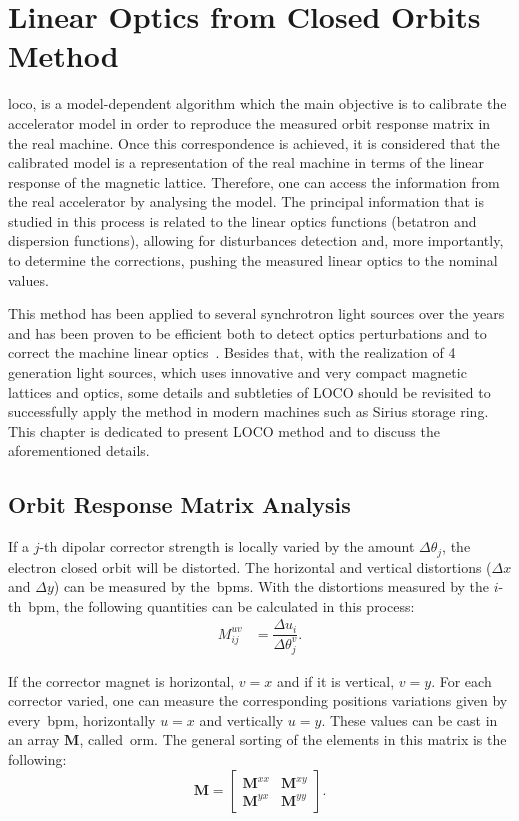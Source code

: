 \chapter{Linear Optics from Closed Orbits Method}\label{chap:loco}
\gls{loco}, is a model-dependent algorithm which the main objective is to calibrate the accelerator model in order to reproduce the measured orbit response matrix in the real machine. Once this correspondence is achieved, it is considered that the calibrated model is a representation of the real machine in terms of the linear response of the magnetic lattice. Therefore, one can access the information from the real accelerator by analysing the model. The principal information that is studied in this process is related to the linear optics functions (betatron and dispersion functions), allowing for disturbances detection and, more importantly, to determine the corrections, pushing the measured linear optics to the nominal values.

This method has been applied to several synchrotron light sources over the years and has been proven to be efficient both to detect optics perturbations and to correct the machine linear optics~\cite{safranek1997, icfa_laurent, icfa_australia}. Besides that, with the realization of 4 generation light sources, which uses innovative and very compact magnetic lattices and optics, some details and subtleties of LOCO should be revisited to successfully apply the method in modern machines such as Sirius storage ring. This chapter is dedicated to present LOCO method and to discuss the aforementioned details.
\section{Orbit Response Matrix Analysis}\label{sec:orm_analysis}
If a $j$-th dipolar corrector strength is locally varied by the amount $\Delta \theta_j$, the electron closed orbit will be distorted. The horizontal and vertical distortions ($\Delta x$ and $\Delta y$) can be measured by the~\gls{bpm}s. With the distortions measured by the $i$-th~\gls{bpm}, the following quantities can be calculated in this process:
\begin{align}
    M^{uv}_{ij} &= \dfrac{\Delta u_i}{\Delta \theta_j^v}.
\end{align}

If the corrector magnet is horizontal, $v=x$ and if it is vertical, $v=y$. For each corrector varied, one can measure the corresponding positions variations given by every~\gls{bpm}, horizontally $u=x$ and vertically $u=y$. These values can be cast in an array $\mathbf{M}$, called~\gls{orm}. The general sorting of the elements in this matrix is the following:
\begin{equation}
    \mathbf{M} = \begin{bmatrix}
    \mathbf{M}^{xx} & \mathbf{M}^{xy} \\
    \mathbf{M}^{yx} & \mathbf{M}^{yy} 
\end{bmatrix}.
\end{equation}

